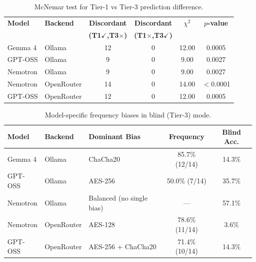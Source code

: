 \begin{table}[htbp]
\centering
\caption{McNemar test for Tier-1 vs Tier-3 prediction difference.}
\label{tab:mcnemar}
\begin{tabular}{llcccc}
\toprule
\textbf{Model} & \textbf{Backend} & \textbf{Discordant} & \textbf{Discordant} & \textbf{$\chi^2$} & \textbf{$p$-value} \\
& & \textbf{(T1$\checkmark$,T3$\times$)} & \textbf{(T1$\times$,T3$\checkmark$)} & & \\
\midrule
Gemma 4 & Ollama & 12 & 0 & 12.00 & 0.0005 \\
GPT-OSS & Ollama & 9 & 0 & 9.00 & 0.0027 \\
Nemotron & Ollama & 9 & 0 & 9.00 & 0.0027 \\
Nemotron & OpenRouter & 14 & 0 & 14.00 & $<$0.0001 \\
GPT-OSS & OpenRouter & 12 & 0 & 12.00 & 0.0005 \\
\bottomrule
\end{tabular}
\end{table}

\begin{table}[htbp]
\centering
\caption{Model-specific frequency biases in blind (Tier-3) mode.}
\label{tab:biases}
\begin{tabular}{lllcc}
\toprule
\textbf{Model} & \textbf{Backend} & \textbf{Dominant Bias} & \textbf{Frequency} & \textbf{Blind Acc.} \\
\midrule
Gemma 4 & Ollama & ChaCha20 & 85.7\% (12/14) & 14.3\% \\
GPT-OSS & Ollama & AES-256 & 50.0\% (7/14) & 35.7\% \\
Nemotron & Ollama & Balanced (no single bias) & — & 57.1\% \\
Nemotron & OpenRouter & AES-128 & 78.6\% (11/14) & 3.6\% \\
GPT-OSS & OpenRouter & AES-256 + ChaCha20 & 71.4\% (10/14) & 14.3\% \\
\bottomrule
\end{tabular}
\end{table}

